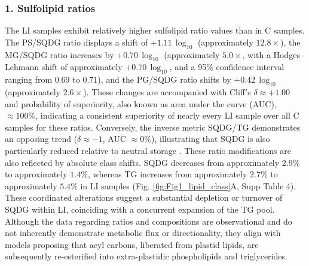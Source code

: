 \documentclass[10pt,letterpaper]{article}
\begin{document}
\begin{itemize}
\subsubsection*{1. Sulfolipid ratios}
The LI samples exhibit relatively higher sulfolipid ratio values than in C samples. The PS/SQDG ratio displays a shift of $+1.11 \,\log_{10}$ (approximately $12.8\times$), the MG/SQDG ratio increases by $+0.70 \,\log_{10}$ (approximately $5.0\times$, with a Hodges--Lehmann shift of approximately $+0.70 \,\log_{10}$, and a 95\% confidence interval ranging from $0.69$ to $0.71$), and the PG/SQDG ratio shifts by $+0.42 \,\log_{10}$ (approximately $2.6\times$). These changes are accompanied with Cliff’s $\delta \approx +1.00$ and probability of superiority, also known as area under the curve (AUC), $\approx 100\%$, indicating a consistent superiority of nearly every LI sample over all C samples for these ratios. Conversely, the inverse metric SQDG/TG demonstrates an opposing trend ($\delta \approx -1$, AUC $\approx 0\%$), illustrating that SQDG is also particularly reduced relative to neutral storage . These ratio modifications are also reflected by absolute class shifts. SQDG decreases from approximately $2.9\%$ to approximately $1.4\%$, whereas TG increases from approximately $2.7\%$ to approximately $5.4\%$ in LI samples (Fig. \ref{fig:Fig1_lipid_class}A, Supp Table 4). These coordinated alterations suggest a substantial depletion or turnover of SQDG within LI, coinciding with a concurrent expansion of the TG pool. Although the data regarding ratios and compositions are observational and do not inherently demonstrate metabolic flux or directionality, they align with models proposing that acyl carbons, liberated from plastid lipids, are subsequently re-esterified into extra-plastidic phospholipids and triglycerides.





\end{itemize}
\end{document}
